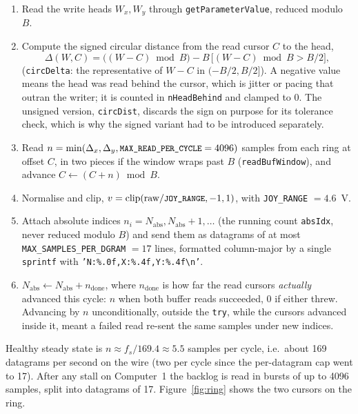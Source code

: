 \documentclass[11pt,a4paper]{article}
\newcommand{\code}[1]{\texttt{\small #1}}
\begin{document}
\begin{enumerate}[leftmargin=*,itemsep=1pt]
\item Read the write heads $W_x, W_y$ through \code{getParameterValue}, reduced
modulo $B$.
\item Compute the signed circular distance from the read cursor $C$ to the head,
\begin{equation}
  \Delta(W, C) = \big((W - C) \bmod B\big) - B\,\big[(W - C) \bmod B > B/2\big],
  \label{eq:circdelta}
\end{equation}
(\code{circDelta}: the representative of $W-C$ in $(-B/2, B/2]$). A negative
value means the head was read behind the cursor, which is jitter or pacing that
outran the writer; it is counted in \code{nHeadBehind} and clamped to 0. The
unsigned version, \code{circDist}, discards the sign on purpose for its
tolerance check, which is why the signed variant had to be introduced
separately.
\item Read $n = \min(\Delta_x, \Delta_y, \code{MAX\_READ\_PER\_CYCLE} = 4096)$
samples from each ring at offset $C$, in two pieces if the window wraps past $B$
(\code{readBufWindow}), and advance $C \leftarrow (C + n) \bmod B$.
\item Normalise and clip, $v = \operatorname{clip}(\text{raw}/\code{JOY\_RANGE},
-1, 1)$, with \code{JOY\_RANGE} $= 4.6$~V.
\item Attach absolute indices $n_i = N_{\text{abs}}, N_{\text{abs}}+1, \dots$
(the running count \code{absIdx}, never reduced modulo $B$) and send them as
datagrams of at most \code{MAX\_SAMPLES\_PER\_DGRAM} $= 17$ lines, formatted
column-major by a single \code{sprintf} with
\code{'N:\%.0f,X:\%.4f,Y:\%.4f\textbackslash n'}.
\item $N_{\text{abs}} \leftarrow N_{\text{abs}} + n_{\text{done}}$, where
$n_{\text{done}}$ is how far the read cursors \emph{actually} advanced this
cycle: $n$ when both buffer reads succeeded, 0 if either threw. Advancing by
$n$ unconditionally, outside the \code{try}, while the cursors advanced inside
it, meant a failed read re-sent the same samples under new indices.
\end{enumerate}

Healthy steady state is $n \approx f_s/169.4 \approx 5.5$ samples per cycle,
i.e.\ about 169 datagrams per second on the wire (two per cycle since the
per-datagram cap went to 17). After any stall on Computer~1 the backlog is read
in bursts of up to 4096 samples, split into datagrams of 17.
Figure~\ref{fig:ring} shows the two cursors on the ring.
\end{document}
